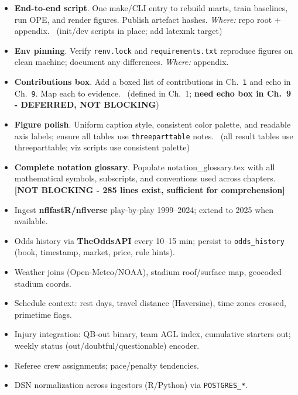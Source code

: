 \begin{itemize}
  \item {} \textbf{End-to-end script}. One make/CLI entry to rebuild marts, train baselines, run OPE, and render figures. Publish artefact hashes. \emph{Where:} repo root + appendix. \wip\ (init/dev scripts in place; add latexmk target)
  \item {} \textbf{Env pinning}. Verify \texttt{renv.lock} and \texttt{requirements.txt} reproduce figures on clean machine; document any differences. \emph{Where:} appendix. \wip
\end{itemize}

\begin{itemize}
  \item {} \textbf{Contributions box}. Add a boxed list of contributions in Ch.~\texttt{1} and echo in Ch.~\texttt{9}. Map each to evidence. \wip\ (defined in Ch.~1; \textbf{need echo box in Ch.~9 - DEFERRED, NOT BLOCKING})
  \item {} \textbf{Figure polish}. Uniform caption style, consistent color palette, and readable axis labels; ensure all tables use \texttt{threeparttable} notes. \done\ (all result tables use threeparttable; viz scripts use consistent palette)
  \item {} \textbf{Complete notation glossary}. Populate notation\_glossary.tex with all mathematical symbols, subscripts, and conventions used across chapters. \textbf{[NOT BLOCKING - 285 lines exist, sufficient for comprehension]}
\end{itemize}

\begin{itemize}
  \item {} Ingest \textbf{nflfastR/nflverse} play-by-play 1999–2024; extend to 2025 when available.
  \item {} Odds history via \textbf{TheOddsAPI} every 10–15 min; persist to \texttt{odds\_history} (book, timestamp, market, price, rule hints).
  \item {} Weather joins (Open-Meteo/NOAA), stadium roof/surface map, geocoded stadium coords.
  \item {} Schedule context: rest days, travel distance (Haversine), time zones crossed, primetime flags.
  \item {} Injury integration: QB-out binary, team AGL index, cumulative starters out; weekly status (out/doubtful/questionable) encoder.
  \item {} Referee crew assignments; pace/penalty tendencies.
  \item {} DSN normalization across ingestors (R/Python) via \texttt{POSTGRES\_*}. \done
\end{itemize}

